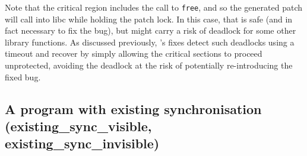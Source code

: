 Note that the critical region includes the call to \texttt{free}, and
so the generated patch will call into libc while holding the patch
lock.  In this case, that is safe (and in fact necessary to fix the
bug), but might carry a risk of deadlock for some other library
functions.  As discussed previously, {\technique}'s fixes detect such
deadlocks using a timeout and recover by simply allowing the critical
sections to proceed unprotected, avoiding the deadlock at the risk of
potentially re-introducing the fixed bug.

\subsection{A program with existing synchronisation (existing\_sync\_visible, existing\_sync\_invisible)}

